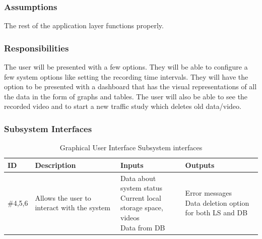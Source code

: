 \subsubsection{Assumptions}
The rest of the application layer functions properly.

\subsubsection{Responsibilities}
The user will be presented with a few options. They will be able to configure a few system options like setting the recording time intervals. They will have the option to be presented with a dashboard that has the visual representations of all the data in the form of graphs and tables. The user will also be able to see the recorded video and to start a new traffic study which deletes old data/video.

\subsubsection{Subsystem Interfaces}

\begin {table}[H]
\caption {Graphical User Interface Subsystem interfaces} 
\begin{center}
    \begin{tabular}{ | p{1cm} | p{6cm} | p{3cm} | p{3cm} |}
    \hline
    ID & Description & Inputs & Outputs \\ \hline
    \#4,5,6 & Allows the user to interact with the system & \pbox{3cm}{Data about system status \\ Current local storage space, videos \\ Data from DB} & \pbox{3cm}{Error messages \\ Data deletion option for both LS and DB}  \\ \hline
    \end{tabular}
\end{center}
\end{table}



